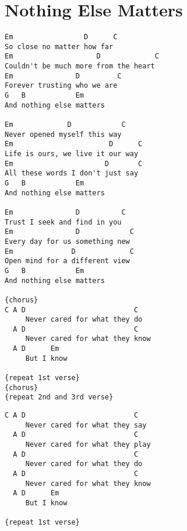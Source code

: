 \documentclass[leqno]{memoir}
\begin{document}
\chapter{Nothing Else Matters}
\begin{verbatim}
Em                 D      C
So close no matter how far
Em                    D             C 
Couldn't be much more from the heart
Em               D         C
Forever trusting who we are
G   B            Em
And nothing else matters

Em             D            C
Never opened myself this way
Em                       D      C
Life is ours, we live it our way
Em                      D       C
All these words I don't just say
G   B            Em
And nothing else matters

Em               D          C
Trust I seek and find in you
Em               D            C
Every day for us something new
Em              D             C
Open mind for a different view
G   B            Em
And nothing else matters 

{chorus}
C A D                          C
     Never cared for what they do
  A D                          C
     Never cared for what they know
  A D      Em
     But I know

{repeat 1st verse}
{chorus}
{repeat 2nd and 3rd verse}
\end{verbatim}
\newpage
\begin{verbatim}
C A D                          C
     Never cared for what they say
  A D                          C
     Never cared for what they play
  A D                          C
     Never cared for what they do
  A D                          C
     Never cared for what they know
  A D      Em
     But I know

{repeat 1st verse}

\end{verbatim}
\newpage
\end{document}
